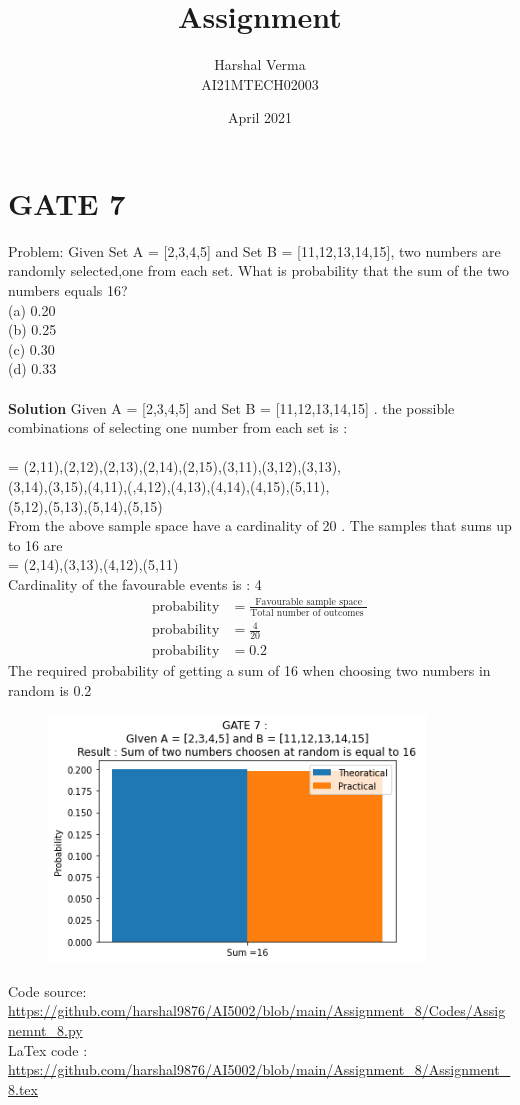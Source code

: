 \documentclass[journal,12pt,twocolumn]{IEEEtran}
\title{Assignment  }
\author{Harshal Verma\\
AI21MTECH02003}
\date{April 2021}
\begin{document}
\maketitle
\section{GATE 7}
Problem: Given Set A = [2,3,4,5] and Set B =
[11,12,13,14,15], two numbers are randomly
selected,one from each set. What is probability
that the sum of the two numbers equals 16? \\
(a) 0.20\\
(b) 0.25\\
(c) 0.30\\
(d) 0.33\\
\smallskip
\\
\textbf{Solution }
Given A = [2,3,4,5] and Set B = [11,12,13,14,15] . the possible combinations of selecting one number from each set is :\\
\\
=  {(2,11),(2,12),(2,13),(2,14),(2,15),(3,11),(3,12),(3,13),\\(3,14),(3,15),(4,11),(,4,12),(4,13),(4,14),(4,15),(5,11),\\(5,12),(5,13),(5,14),(5,15)} \\
\smallskip
From the above sample space have a cardinality of 20 . The samples that sums up to 16 are \\
= {(2,14),(3,13),(4,12),(5,11)}\\
\smallskip
Cardinality of the favourable events is : 4
\smallskip
\begin{align*}
\text{probability} &= \frac{\text{Favourable sample space}}{\text{Total number of outcomes }}\\
\text{probability} &= \frac{4}{20}\\
\text{probability} &= 0.2
\end{align*}
\smallskip
The required probability of getting a sum of 16 when choosing two numbers in random is 0.2 \\
\smallskip

\begin{figure}[htp]
    \centering
    \includegraphics[width=10cm]{Assignemnt_8}
    \label{fig :plot}
\end{figure}

\begin{tcolorbox}
Code source: \url{https://github.com/harshal9876/AI5002/blob/main/Assignment_8/Codes/Assignemnt_8.py} \\
LaTex code :
\url{https://github.com/harshal9876/AI5002/blob/main/Assignment_8/Assignment_8.tex}
\end{tcolorbox}
\vfill
\end{document}
